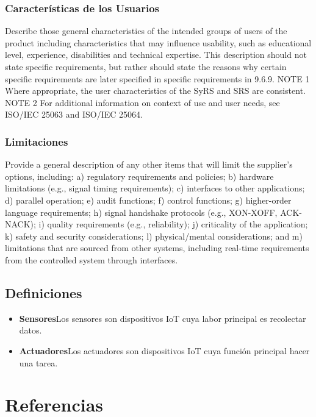 \documentclass[12pt, a4paper, twoside]{article}
\newcommand\ttab{\tab \hspace{-5cm}}
\begin{document}
 \subsubsection{Características de los Usuarios}
 Describe those general characteristics of the intended groups of users of the product including
 characteristics that may influence usability, such as educational level, experience, disabilities and
 technical expertise. This description should not state specific requirements, but rather should state the
 reasons why certain specific requirements are later specified in specific requirements in 9.6.9.
 NOTE 1 Where appropriate, the user characteristics of the SyRS and SRS are consistent.
 NOTE 2 For additional information on context of use and user needs, see ISO/IEC 25063 and ISO/IEC 25064.

 \subsubsection{Limitaciones}
 Provide a general description of any other items that will limit the supplier's options, including:
 a) regulatory requirements and policies;
 b) hardware limitations (e.g., signal timing requirements);
 c) interfaces to other applications;
 d) parallel operation;
 e) audit functions;
 f) control functions;
 g) higher-order language requirements;
 h) signal handshake protocols (e.g., XON-XOFF, ACK-NACK);
 i) quality requirements (e.g., reliability);
 j) criticality of the application;
 k) safety and security considerations;
 l) physical/mental considerations; and
 m) limitations that are sourced from other systems, including real-time requirements from the
 controlled system through interfaces.

\subsection{Definiciones}
\begin{itemize}
    \item \textbf{Sensores}\ttab Los sensores son dispositivos IoT cuya labor principal es recolectar datos.
    \item \textbf{Actuadores}\ttab Los actuadores son dispositivos IoT cuya función principal hacer una tarea.
\end{itemize}

\section{Referencias}
\end{document}
